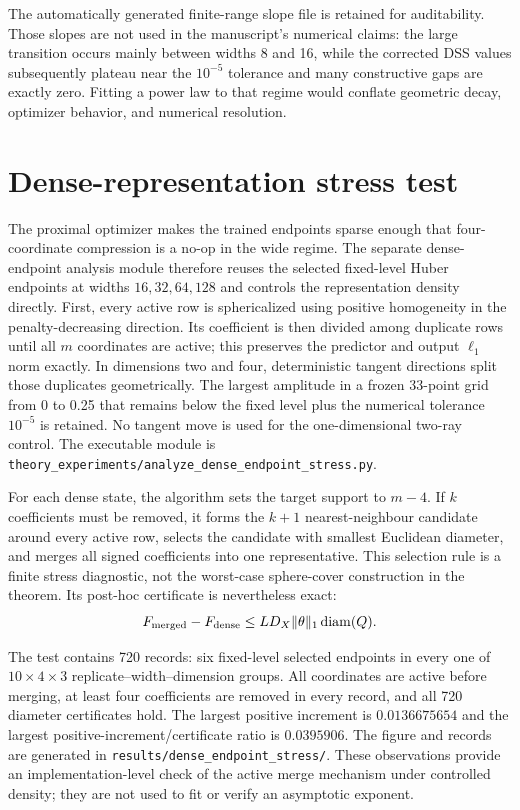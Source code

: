 \documentclass[11pt,a4paper]{article}
\begin{document}
The automatically generated finite-range slope file is retained for auditability. Those slopes are not used in the manuscript's numerical claims: the large transition occurs mainly between widths 8 and 16, while the corrected DSS values subsequently plateau near the $10^{-5}$ tolerance and many constructive gaps are exactly zero. Fitting a power law to that regime would conflate geometric decay, optimizer behavior, and numerical resolution.

\section*{Dense-representation stress test}

The proximal optimizer makes the trained endpoints sparse enough that four-coordinate compression is a no-op in the wide regime. The separate dense-endpoint analysis module therefore reuses the selected fixed-level Huber endpoints at widths $16,32,64,128$ and controls the representation density directly. First, every active row is sphericalized using positive homogeneity in the penalty-decreasing direction. Its coefficient is then divided among duplicate rows until all $m$ coordinates are active; this preserves the predictor and output $\ell_1$ norm exactly. In dimensions two and four, deterministic tangent directions split those duplicates geometrically. The largest amplitude in a frozen 33-point grid from 0 to 0.25 that remains below the fixed level plus the numerical tolerance $10^{-5}$ is retained. No tangent move is used for the one-dimensional two-ray control. The executable module is \texttt{theory\_experiments/analyze\_dense\_endpoint\_stress.py}.

For each dense state, the algorithm sets the target support to $m-4$. If $k$ coefficients must be removed, it forms the $k+1$ nearest-neighbour candidate around every active row, selects the candidate with smallest Euclidean diameter, and merges all signed coefficients into one representative. This selection rule is a finite stress diagnostic, not the worst-case sphere-cover construction in the theorem. Its post-hoc certificate is nevertheless exact:
\[
F_{\rm merged}-F_{\rm dense}
\le
LD_X\lVert\theta\rVert_1\operatorname{diam}(Q).
\]

The test contains 720 records: six fixed-level selected endpoints in every one of $10\times4\times3$ replicate--width--dimension groups. All coordinates are active before merging, at least four coefficients are removed in every record, and all 720 diameter certificates hold. The largest positive increment is $0.0136675654$ and the largest positive-increment/certificate ratio is $0.0395906$. The figure and records are generated in \texttt{results/dense\_endpoint\_stress/}. These observations provide an implementation-level check of the active merge mechanism under controlled density; they are not used to fit or verify an asymptotic exponent.
\end{document}
